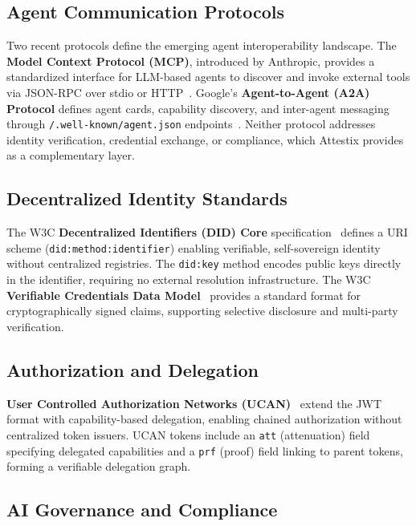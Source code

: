 \documentclass[conference]{IEEEtran}
\begin{document}
\subsection{Agent Communication Protocols}

Two recent protocols define the emerging agent interoperability landscape. The \textbf{Model Context Protocol (MCP)}, introduced by Anthropic, provides a standardized interface for LLM-based agents to discover and invoke external tools via JSON-RPC over stdio or HTTP~\cite{mcp2024}. Google's \textbf{Agent-to-Agent (A2A) Protocol} defines agent cards, capability discovery, and inter-agent messaging through \texttt{/.well-known/agent.json} endpoints~\cite{a2a2025}. Neither protocol addresses identity verification, credential exchange, or compliance, which Attestix provides as a complementary layer.

\subsection{Decentralized Identity Standards}

The W3C \textbf{Decentralized Identifiers (DID) Core} specification~\cite{w3cdid2022} defines a URI scheme (\texttt{did:method:identifier}) enabling verifiable, self-sovereign identity without centralized registries. The \texttt{did:key} method encodes public keys directly in the identifier, requiring no external resolution infrastructure. The W3C \textbf{Verifiable Credentials Data Model}~\cite{w3cvc2022} provides a standard format for cryptographically signed claims, supporting selective disclosure and multi-party verification.

\subsection{Authorization and Delegation}

\textbf{User Controlled Authorization Networks (UCAN)}~\cite{ucan2023} extend the JWT format with capability-based delegation, enabling chained authorization without centralized token issuers. UCAN tokens include an \texttt{att} (attenuation) field specifying delegated capabilities and a \texttt{prf} (proof) field linking to parent tokens, forming a verifiable delegation graph.

\subsection{AI Governance and Compliance}
\end{document}
